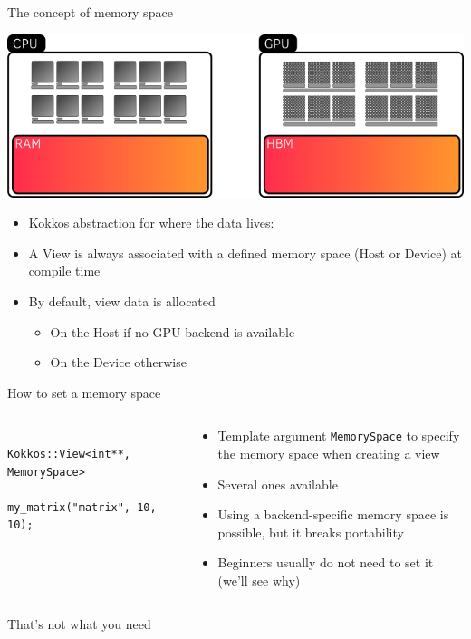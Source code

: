 \documentclass[
    aspectratio=169,
]{beamer}
\begin{document}

\begin{frame}{The concept of memory space}
    \begin{center}
        \includegraphics[width=0.7\linewidth]{memory_space.png}
    \end{center}
    \begin{itemize}
        \item Kokkos abstraction for where the data lives: 
        \item A View is always associated with a defined memory space (Host or Device) at compile time
        \item By default, view data is allocated
        \begin{itemize}
            \item On the Host if no GPU backend is available
            \item On the Device otherwise
        \end{itemize}
    \end{itemize}
\end{frame}


\begin{frame}[fragile]{How to set a memory space}
    \begin{columns}
        \begin{column}{0.5\linewidth}
            \begin{verbatim}
                Kokkos::View<int**, MemorySpace>
                    my_matrix("matrix", 10, 10);
            \end{verbatim}
        \end{column}
        \begin{column}{0.5\linewidth}
            \begin{itemize}
                \item Template argument \texttt{MemorySpace} to specify the memory space when creating a view
                \item Several ones available
                \item Using a backend-specific memory space is possible, but it breaks portability
                \item Beginners usually do not need to set it (we'll see why)
            \end{itemize}
        \end{column}
    \end{columns}

     That's not what you need
\end{frame}
\end{document}
